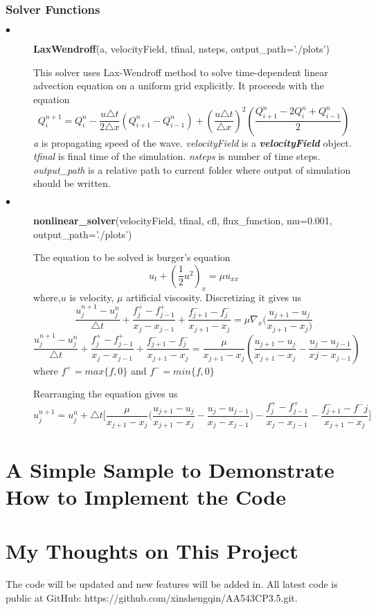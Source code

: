 \documentclass[11pt]{article}
\begin{document}
        \subsubsection{Solver Functions}
        \begin{description}
	    \item[$\bullet$]\textbf{LaxWendroff}(a, velocityField, tfinal, nsteps, output\_path='./plots')
                \par
		This solver uses Lax-Wendroff method to solve time-dependent linear advection equation on a uniform grid explicitly.
		It proceeds with the equation
		$$
		Q^{n+1}_i = Q^n_i - \frac{u\triangle t}{2\triangle x}(Q^n_{i+1} - Q^n_{i-1}) + (\frac{u\triangle t}{\triangle x})^2(\frac{Q^n_{i+1}-2Q^n_i+Q^n_{i-1}}{2})
		$$
		\textit{a} is propagating speed of the wave.
		\textit{velocityField} is a \textbf{\textit{velocityField}} object.
		\textit{tfinal} is final time of the simulation.
		\textit{nsteps} is number of time steps.
		\textit{output\_path} is a relative path to current folder where output of simulation should be written. 
	    \item[$\bullet$]\textbf{nonlinear\_solver}(velocityField, tfinal, cfl, flux\_function, mu=0.001, output\_path='./plots')
                \par
		The equation to be solved is burger's equation
		$$
		u_t + (\frac{1}{2}u^2)_x = \mu u_{xx}
		$$
		where,$u$ is velocity, $\mu$ artificial viscosity.
		Discretizing it gives us
		$$
		\frac{u^{n+1}_j-u^n_j}{\triangle t} + \frac{f^+_j-f^+_{j-1}}{x_j-x_{j-1}} + \frac{f^-_{j+1}-f^-_j}{x_{j+1}-x_{j}} = \mu {\nabla}_x (\frac{u_{j+1}-u_{j}}{x_{j+1}-x_j)}
		$$
		$$
		    \frac{u^{n+1}_j-u^n_j}{\triangle t} + \frac{f^+_j-f^+_{j-1}}{x_j-x_{j-1}} + \frac{f^-_{j+1}-f^-_j}{x_{j+1}-x_{j}} = \frac{\mu}{x_{j+1}-x_j}(\frac{u_{j+1}-u_j}{x_{j+1}-x_j}-\frac{u_j-u_{j-1}}{xj-x_{j-1}}) 
		$$
		where $f^+ = max\{f,0\}$ and $f^- = min\{f,0\}$
		\par
		Rearranging the equation gives us
		$$
		u^{n+1}_j = u^n_j + \triangle t \Bigg[\frac{\mu}{x_{j+1}-x_j} \bigg(\frac{u_{j+1}-u_j}{x_{j+1}-x_j}-\frac{u_j-u_{j-1}}{x_j-x_{j-1}}\bigg)-\frac{f^+_j-f^+_{j-1}}{x_j-x_{j-1}} - \frac{f^-_{j+1}-f^-{j}}{x_{j+1}-x_j} \Bigg]
		$$
	\end{description}

\section{A Simple Sample to Demonstrate How to Implement the Code} 
\section{My Thoughts on This Project}

The code will be updated and new features will be added in. 
All latest code is public at GitHub: https://github.com/xinshengqin/AA543CP3.5.git. 
\end{document}
